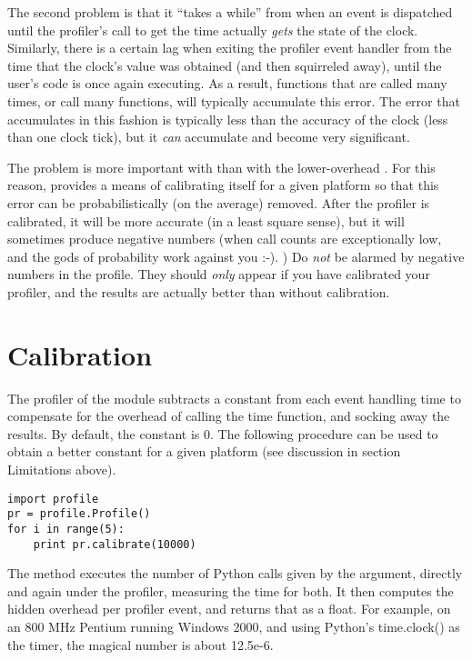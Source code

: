 The second problem is that it ``takes a while'' from when an event is
dispatched until the profiler's call to get the time actually
\emph{gets} the state of the clock.  Similarly, there is a certain lag
when exiting the profiler event handler from the time that the clock's
value was obtained (and then squirreled away), until the user's code
is once again executing.  As a result, functions that are called many
times, or call many functions, will typically accumulate this error.
The error that accumulates in this fashion is typically less than the
accuracy of the clock (less than one clock tick), but it
\emph{can} accumulate and become very significant.

The problem is more important with  than with the
lower-overhead .  For this reason, 
provides a means of calibrating itself for a given platform so that
this error can be probabilistically (on the average) removed.
After the profiler is calibrated, it will be more accurate (in a least
square sense), but it will sometimes produce negative numbers (when
call counts are exceptionally low, and the gods of probability work
against you :-). )  Do \emph{not} be alarmed by negative numbers in
the profile.  They should \emph{only} appear if you have calibrated
your profiler, and the results are actually better than without
calibration.


\section{Calibration \label{profile-calibration}}

The profiler of the  module subtracts a constant from each
event handling time to compensate for the overhead of calling the time
function, and socking away the results.  By default, the constant is 0.
The following procedure can
be used to obtain a better constant for a given platform (see discussion
in section Limitations above).

\begin{verbatim}
import profile
pr = profile.Profile()
for i in range(5):
    print pr.calibrate(10000)
\end{verbatim}

The method executes the number of Python calls given by the argument,
directly and again under the profiler, measuring the time for both.
It then computes the hidden overhead per profiler event, and returns
that as a float.  For example, on an 800 MHz Pentium running
Windows 2000, and using Python's time.clock() as the timer,
the magical number is about 12.5e-6.

